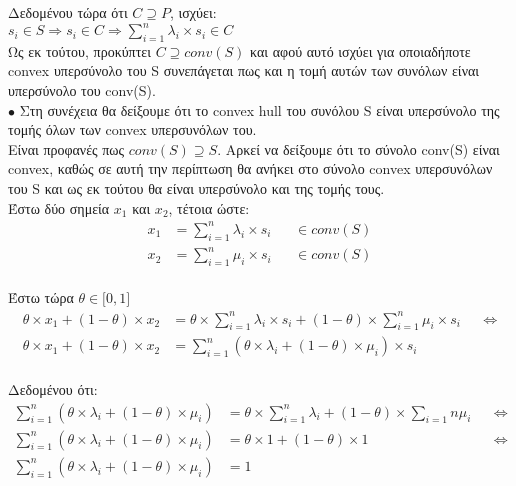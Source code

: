 \documentclass[12pt]{article}
\begin{document}
Δεδομένου τώρα ότι $C \supseteq P$, ισχύει:\\

$s_i \in S \Rightarrow s_i \in C \Rightarrow \sum_{i = 1}^{n} λ_i \times s_i \in C$\\

Ως εκ τούτου, προκύπτει $C \supseteq conv(S)$ και αφού αυτό ισχύει για οποιαδήποτε convex
υπερσύνολο του S συνεπάγεται πως και η τομή αυτών των συνόλων είναι υπερσύνολο του conv(S).\\

$\bullet$ Στη συνέχεια θα δείξουμε ότι το convex hull του συνόλου S είναι υπερσύνολο της
τομής όλων των convex υπερσυνόλων του.\\

Είναι προφανές πως $conv(S) \supseteq S$. Αρκεί να δείξουμε ότι το σύνολο conv(S)
είναι convex, καθώς σε αυτή την περίπτωση θα ανήκει στο σύνολο convex υπερσυνόλων του
S και ως εκ τούτου θα είναι υπερσύνολο και της τομής τους.\\

Έστω δύο σημεία $x_1$ και $x_2$, τέτοια ώστε:\\

\begin{align*}
    x_1 & = \sum_{i = 1}^{n} λ_i \times s_i && \in conv(S) \\
    x_2 & = \sum_{i = 1}^{n} μ_i \times s_i && \in conv(S)
\end{align*}\\

Έστω τώρα $\theta \in \lbrack 0, 1 \rbrack$\\

\begin{align*}
    \theta \times x_1 + (1 - \theta) \times x_2 & = \theta \times \sum_{i = 1}^{n} λ_i \times s_i + (1 - \theta) \times \sum_{i = 1}^{n} μ_i \times s_i && \Leftrightarrow \\
    \theta \times x_1 + (1 - \theta) \times x_2 & = \sum_{i = 1}^{n}(\theta \times λ_i + (1 - \theta) \times μ_i) \times s_i
\end{align*}\\

Δεδομένου ότι:\\

\begin{align*}
    \sum_{i = 1}^{n}(\theta \times λ_i + (1 - \theta) \times μ_i) & = \theta \times \sum_{i = 1}^{n} λ_i + (1 - \theta) \times \sum_{i = 1}{n} μ_i && \Leftrightarrow \\
    \sum_{i = 1}^{n}(\theta \times λ_i + (1 - \theta) \times μ_i) & = \theta \times 1 + (1 - \theta) \times 1 && \Leftrightarrow \\
    \sum_{i = 1}^{n}(\theta \times λ_i + (1 - \theta) \times μ_i) & = 1
\end{align*}\\
\end{document}
